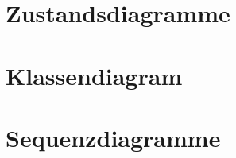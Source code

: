 \documentclass[DIV=13, 10pt,a4paper]{scrartcl}
\begin{document}
\pagebreak

\section{Zustandsdiagramme}


\section{Klassendiagram}

\pagebreak

\section{Sequenzdiagramme}




\pagebreak
\renewcommand{\appendixtocname}{Appendix}
\renewcommand{\appendixpagename}{Appendix}
\begin{appendices}
	\makeatletter
	{
		\begingroup
		\let\protect\l@chapter\protect\l@section
		\let\protect\l@section\protect\l@subsection
	}

	
	
	\pagebreak
	
	
	
	\pagebreak

	
	
\end{appendices}
\end{document}
